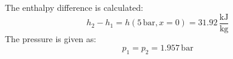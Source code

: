 The enthalpy difference is calculated:  
\[
h_2 - h_1 = h(5 \, \text{bar}, x=0) = 31.92 \, \frac{\text{kJ}}{\text{kg}}
\]  
The pressure is given as:  
\[
p_1 = p_2 = 1.957 \, \text{bar}
\]